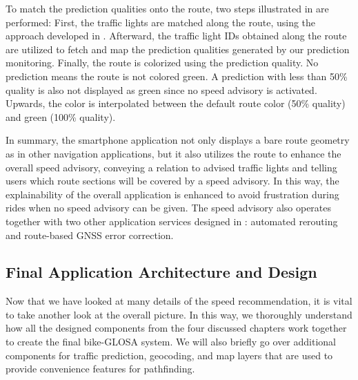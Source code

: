 To match the prediction qualities onto the route, two steps illustrated in  are performed: First, the traffic lights are matched along the route, using the approach developed in . Afterward, the traffic light IDs obtained along the route are utilized to fetch and map the prediction qualities generated by our prediction monitoring. Finally, the route is colorized using the prediction quality. No prediction means the route is not colored green. A prediction with less than 50\% quality is also not displayed as green since no speed advisory is activated. Upwards, the color is interpolated between the default route color (50\% quality) and green (100\% quality).

In summary, the smartphone application not only displays a bare route geometry as in other navigation applications, but it also utilizes the route to enhance the overall speed advisory, conveying a relation to advised traffic lights and telling users which route sections will be covered by a speed advisory. In this way, the explainability of the overall application is enhanced to avoid frustration during rides when no speed advisory can be given. The speed advisory also operates together with two other application services designed in : automated rerouting and route-based GNSS error correction.

\subsection{Final Application Architecture and Design}

Now that we have looked at many details of the speed recommendation, it is vital to take another look at the overall picture. In this way, we thoroughly understand how all the designed components from the four discussed chapters work together to create the final bike-GLOSA system. We will also briefly go over additional components for traffic prediction, geocoding, and map layers that are used to provide convenience features for pathfinding.

